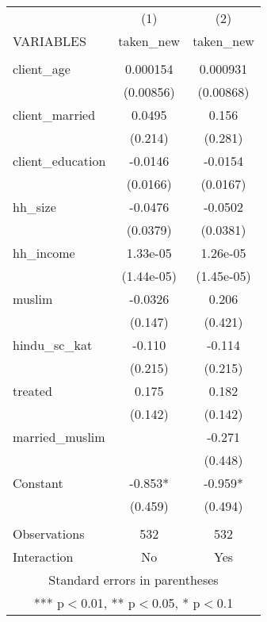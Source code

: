 \begin{tabular}{lcc} \hline
 & (1) & (2) \\
VARIABLES & taken\_new & taken\_new \\ \hline
 &  &  \\
client\_age & 0.000154 & 0.000931 \\
 & (0.00856) & (0.00868) \\
client\_married & 0.0495 & 0.156 \\
 & (0.214) & (0.281) \\
client\_education & -0.0146 & -0.0154 \\
 & (0.0166) & (0.0167) \\
hh\_size & -0.0476 & -0.0502 \\
 & (0.0379) & (0.0381) \\
hh\_income & 1.33e-05 & 1.26e-05 \\
 & (1.44e-05) & (1.45e-05) \\
muslim & -0.0326 & 0.206 \\
 & (0.147) & (0.421) \\
hindu\_sc\_kat & -0.110 & -0.114 \\
 & (0.215) & (0.215) \\
treated & 0.175 & 0.182 \\
 & (0.142) & (0.142) \\
married\_muslim &  & -0.271 \\
 &  & (0.448) \\
Constant & -0.853* & -0.959* \\
 & (0.459) & (0.494) \\
 &  &  \\
Observations & 532 & 532 \\
 Interaction & No & Yes \\ \hline
\multicolumn{3}{c}{ Standard errors in parentheses} \\
\multicolumn{3}{c}{ *** p$<$0.01, ** p$<$0.05, * p$<$0.1} \\
\end{tabular}
